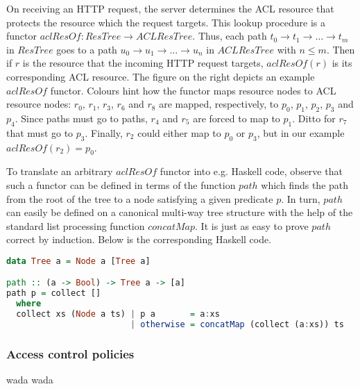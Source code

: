 On receiving an HTTP request, the server determines the ACL resource
that protects the resource which the request targets. This lookup
procedure is a functor $aclResOf : ResTree \rightarrow ACLResTree$.
Thus, each path $t_0 \rightarrow t_1 \rightarrow \ldots \rightarrow t_m$ in $ResTree$
goes to a path $u_0 \rightarrow u_1 \rightarrow \ldots \rightarrow u_n$
in $ACLResTree$ with $n \leq m$. Then if $r$ is the resource that
the incoming HTTP request targets, $aclResOf(r)$ is its corresponding
ACL resource. The figure on the right depicts an example $aclResOf$
functor. Colours hint how the functor maps resource nodes to ACL
resource nodes: $r_0$, $r_1$, $r_3$, $r_6$ and $r_8$ are mapped,
respectively, to $p_0$, $p_1$, $p_2$, $p_3$ and $p_4$. Since paths
must go to paths, $r_4$ and $r_5$ are forced to map to $p_1$. Ditto
for $r_7$ that must go to $p_3$. Finally, $r_2$ could either map to
$p_0$ or $p_3$, but in our example $aclResOf(r_2) = p_0$.

To translate an arbitrary $aclResOf$ functor into e.g. Haskell code,
observe that such a functor can be defined in terms of the function
$path$ which finds the path from the root of the tree to a node satisfying
a given predicate $p$. In turn, $path$ can easily be defined on a
canonical multi-way tree structure with the help of the standard
list processing function $concatMap$. It is just as easy to prove
$path$ correct by induction. Below is the corresponding Haskell code.
\\
\begin{lstlisting}[language=Haskell]
data Tree a = Node a [Tree a]

path :: (a -> Bool) -> Tree a -> [a]
path p = collect []
  where
  collect xs (Node a ts) | p a       = a:xs
                         | otherwise = concatMap (collect (a:xs)) ts
\end{lstlisting}


\subsubsection{Access control policies}
wada wada